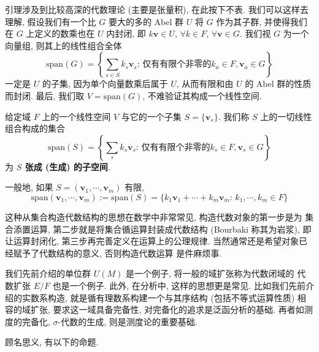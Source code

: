 \documentclass[UTF8]{book}
\begin{document}
引理涉及到比较高深的代数理论 (主要是张量积), 在此按下不表. 
我们可以这样去理解, 假设我们有一个比 $G$ 要大的多的 Abel 群 $U$ 
将 $G$ 作为其子群, 并使得我们在 $G$ 上定义的数乘也在 $U$ 内封闭, 
即 $k\boldsymbol{v} \in U$, $\forall k \in F$, 
$\forall \boldsymbol{v} \in G$. 我们视 $G$ 为一个向量组, 
则其上的线性组合全体
$$ \mathrm{span}(G) = \left\{\sum_{s\in S}k_s\boldsymbol{v}_s: \,
\mbox{仅有有限个非零的}k_a\in F,\boldsymbol{v}_a\in G\right\}$$
一定是 $U$ 的子集, 因为单个向量数乘后属于 $U$, 从而有限和由 $U$ 
的 Abel 群的性质而封闭. 
最后, 我们取 $V = \mathrm{span}(G)$, 不难验证其构成一个线性空间. 


\begin{definition}
    给定域 $F$ 上的一个线性空间 $V$ 与它的一个子集 
    $S=\{\boldsymbol{v}_s\}$. 
    我们称 $S$ 上的一切线性组合构成的集合 
    $$ \mathrm{span}(S) = \left\{\sum_{s}k_s\boldsymbol{v}_s: \,
\mbox{仅有有限个非零的}k_s\in F,\boldsymbol{v}_s\in G\right\}$$
    为\textbf{ $S$ 张成 (生成) 的子空间}. 

    一般地, 如果 $S=(\boldsymbol{v}_1,\cdots,\boldsymbol{v}_m)$ 
    有限,
    $$ \mathrm{span}(\boldsymbol{v}_1,\cdots,\boldsymbol{v}_m) :=
    \mathrm{span}(S) = \{k_1\boldsymbol{v}_1+\cdots+
    k_m\boldsymbol{v}_m:
     \, k_1,\cdots,k_m \in F \}$$
\end{definition}

\begin{remark}
这种从集合构造代数结构的思想在数学中非常常见, 构造代数对象的第一步是为
集合添置运算, 第二步就是将集合循运算封装成代数结构 (Bourbaki 称其为岩浆), 
即让运算封闭化, 第三步再完善定义在运算上的公理规律. 
当然通常还是希望对象已经赋予了代数结构的意义, 否则构造代数运算
是件麻烦事. 

我们先前介绍的单位群 $U(M)$ 是一个例子, 将一般的域扩张称为代数闭域的
代数扩张 $E/F$ 也是一个例子. 
此外, 在分析中, 这样的思想更是常见. 比如我们先前介绍的实数系构造, 
就是循有理数系构建一个与其序结构 (包括不等式运算性质) 相容的域扩张, 
要求这一域具备完备性, 对完备化的追求是泛函分析的基础. 
再者如测度的完备化, $\sigma$-代数的生成, 则是测度论的重要基础. 

\end{remark}

顾名思义, 有以下的命题. 
\end{document}
